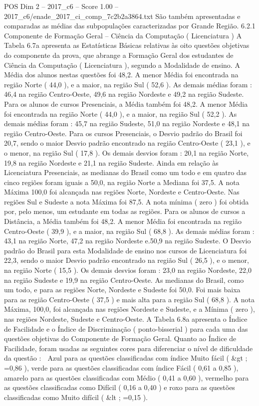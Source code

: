 \begin{textsample}{POS Dim 2 – 2017\_c6 – Score 1.00 – 2017\_c6/enade\_2017\_ci\_comp\_7c2b2a3864.txt}
São também apresentadas e comparadas as médias das subpopulações caracterizadas por Grande Região. 6.2.1 Componente de Formação Geral – Ciência da Computação ( Licenciatura ) A Tabela 6.7a apresenta as Estatísticas Básicas relativas às oito questões objetivas do componente da prova, que abrange a Formação Geral dos estudantes de Ciência da Computação ( Licenciatura ), segundo a Modalidade de ensino.
A Média dos alunos nestas questões foi 48,2.
A menor Média foi encontrada na região Norte ( 44,0 ), e a maior, na região Sul ( 52,6 ).
As demais médias foram : 46,4 na região Centro-Oeste, 49,6 na região Nordeste e 49,2 na região Sudeste.
Para os alunos de cursos Presenciais, a Média também foi 48,2.
A menor Média foi encontrada na região Norte ( 44,0 ), e a maior, na região Sul ( 52,2 ).
As demais médias foram : 45,7 na região Sudeste, 51,0 na região Nordeste e 48,1 na região Centro-Oeste.
Para os cursos Presenciais, o Desvio padrão do Brasil foi 20,7, sendo o maior Desvio padrão encontrado na região Centro-Oeste ( 23,1 ), e o menor, na região Sul ( 17,8 ).
Os demais desvios foram : 20,1 na região Norte, 19,8 na região Nordeste e 21,1 na região Sudeste.
Ainda em relação às Licenciatura Presenciais, as medianas do Brasil como um todo e em quatro das cinco regiões foram iguais a 50,0, na região Norte a Mediana foi 37,5.
A nota Máxima 100,0 foi alcançada nas regiões Norte, Nordeste e Centro-Oeste.
Nas regiões Sul e Sudeste a nota Máxima foi 87,5.
A nota mínima ( zero ) foi obtida por, pelo menos, um estudante em todas as regiões.
Para os alunos de cursos a Distância, a Média também foi 48,2.
A menor Média foi encontrada na região Centro-Oeste ( 39,9 ), e a maior, na região Sul ( 68,8 ).
As demais médias foram : 43,1 na região Norte, 47,2 na região Nordeste e.50,9 na região Sudeste.
O Desvio padrão do Brasil para esta Modalidade de ensino nos cursos de Licenciatura foi 22,3, sendo o maior Desvio padrão encontrado na região Sul ( 26,5 ), e o menor, na região Norte ( 15,5 ).
Os demais desvios foram : 23,0 na região Nordeste, 22,0 na região Sudeste e 19,9 na região Centro-Oeste.
As medianas do Brasil, como um todo, e para as regiões Norte, Nordeste e Sudeste foi 50,0.
Foi mais baixa para as região Centro-Oeste ( 37,5 ) e mais alta para a região Sul ( 68,8 ).
A nota Máxima, 100,0, foi alcançada nas regiões Nordeste e Sudeste, e a Mínima ( zero ), nas regiões Nordeste, Sudeste e Centro-Oeste.
A Tabela 6.8a apresenta o Índice de Facilidade e o Índice de Discriminação ( ponto-bisserial ) para cada uma das questões objetivas do Componente de Formação Geral.
Quanto ao Índice de Facilidade, foram usadas as seguintes cores para diferenciar o nível de dificuldade da questão :  Azul para as questões classificadas com índice Muito fácil ( \&gt ; =0,86 ), verde para as questões classificadas com índice Fácil ( 0,61 a 0,85 ), amarelo para as questões classificadas com Médio ( 0,41 a 0,60 ), vermelho para as questões classificadas como Difícil ( 0,16 a 0,40 ) e roxo para as questões classificadas como Muito difícil ( \&lt ; =0,15 ).

\end{textsample}
